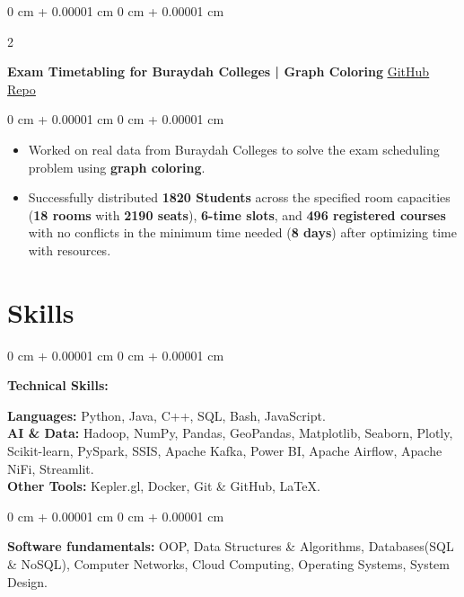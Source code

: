 \documentclass[9pt, letterpaper]{extarticle}
\newenvironment{highlights}{
    \begin{itemize}[
        topsep=0.06 cm,
        parsep=0.06 cm,
        partopsep=0pt,
        itemsep=0pt,
        leftmargin=0 cm + 10pt
    ]
}{
    \end{itemize}
} %
\newenvironment{onecolentry}{
    \begin{adjustwidth}{
        0 cm + 0.00001 cm
    }{
        0 cm + 0.00001 cm
    }
}{
    \end{adjustwidth}
} %
\newenvironment{twocolentry}[2][]{
    \onecolentry
    \def\secondColumn{#2}
    \setcolumnwidth{\fill, 4.5 cm}
    \begin{paracol}{2}
}{
    \switchcolumn \raggedleft \secondColumn
    \end{paracol}
    \endonecolentry
} %
\begin{document}
        \begin{twocolentry}{
            \href{https://github.com/yahia997/Network-Analysis}{\underline{GitHub Repo}}
        }
            \textbf{Exam Timetabling for Buraydah Colleges | Graph Coloring}\end{twocolentry}

        \begin{onecolentry}
            \begin{highlights}
                \item Worked on real data from Buraydah Colleges to solve the exam scheduling problem using \textbf{graph coloring}.
                \item Successfully distributed \textbf{1820 Students} across the specified room capacities (\textbf{18 rooms} with \textbf{2190 seats}), \textbf{6-time slots}, and \textbf{496 registered courses} with no conflicts in the minimum time needed (\textbf{8 days}) after optimizing time with resources.
            \end{highlights}
        \end{onecolentry}

    \section{Skills}
        
        \begin{onecolentry}
            \textbf{Technical Skills:}
            \begin{highlights}
                \textbf{Languages:} Python, Java, C++, SQL, Bash, JavaScript. \\
                \textbf{AI \& Data:} Hadoop, NumPy, Pandas, GeoPandas, Matplotlib, Seaborn, Plotly, Scikit-learn, PySpark, SSIS, Apache Kafka, Power BI, Apache Airflow, Apache NiFi, Streamlit.   \\
                \textbf{Other Tools:} Kepler.gl, Docker, Git \& GitHub, LaTeX.\\
            \end{highlights}
            
        \end{onecolentry}

        \begin{onecolentry}
            \textbf{Software fundamentals:} OOP, Data Structures \& Algorithms, Databases(SQL \& NoSQL), Computer Networks, Cloud Computing, Operating Systems, System Design.
        \end{onecolentry}
\end{document}

